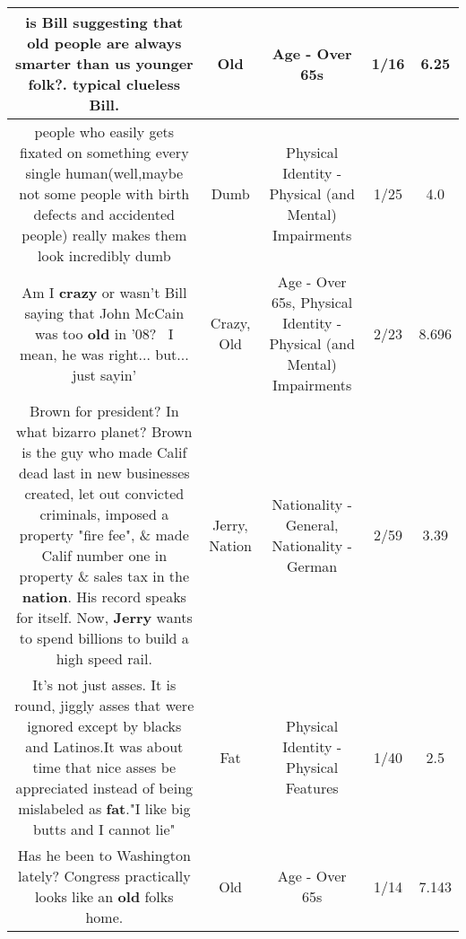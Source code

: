 \documentclass[11pt]{article}
\newlength\mylength
\begin{document}
\begin{center}
\begin{longtable}{|C{.65\mylength}|C{.30\mylength}|C{.12\mylength}|C{.12\mylength}|C{.12\mylength}|}
  \small is Bill suggesting that \textbf{old} people are always smarter than us younger folk?. typical clueless Bill.\normalsize   & Old & Age - Over 65s & 1/16 & 6.25 \\  \hline
  \small people who easily gets fixated on something every single human(well,maybe not some people with birth defects and accidented people) really makes them look incredibly dumb\normalsize   & Dumb & Physical Identity - Physical (and Mental) Impairments & 1/25 & 4.0 \\  \hline
  \small Am I \textbf{crazy} or wasn't Bill saying that John McCain was too \textbf{old} in '08?  I mean, he was right... but... just sayin'\normalsize   & Crazy, Old & Age - Over 65s, Physical Identity - Physical (and Mental) Impairments & 2/23 & 8.696 \\  \hline
  \small Brown for president? In what bizarro planet? Brown is the guy who made Calif dead last in new businesses created, let out convicted criminals, imposed a property "fire fee", \& made Calif number one in property \& sales tax in the \textbf{nation}. His record speaks for itself. Now, \textbf{Jerry} wants to spend billions to build a high speed rail.\normalsize   & Jerry, Nation & Nationality - General, Nationality - German & 2/59 & 3.39 \\  \hline
  \small It's not just asses. It is round, jiggly asses that were ignored except by blacks and Latinos.It was about time that nice asses be appreciated instead of being mislabeled as \textbf{fat}."I like big butts and I cannot lie"\normalsize   & Fat & Physical Identity - Physical Features & 1/40 & 2.5 \\  \hline
  \small Has he been to Washington lately? Congress practically looks like an \textbf{old} folks home.\normalsize   & Old & Age - Over 65s & 1/14 & 7.143 \\  \hline

\end{longtable}
\end{center}
\end{document}

